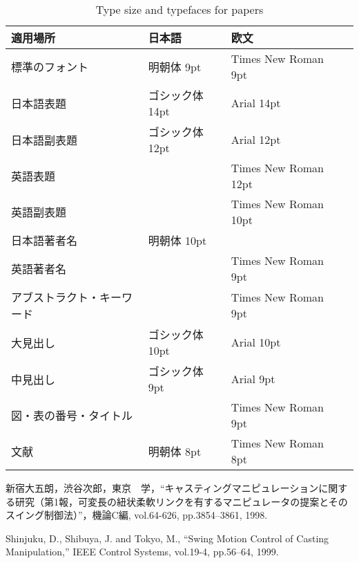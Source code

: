 \documentclass{jarticle}
\begin{document}
\begin{table}[tb]
 \caption{Type size and typefaces for papers}
 \label{tbl: table1}
 \centering
 \footnotesize
 \begin{tabular}{|p{}|l|l|l|}
  \hline
	適用場所	&日本語	&欧文 \\\hline
	標準のフォント	&明朝体 9pt	&Times New Roman 9pt \\\hline
	日本語表題	&ゴシック体 14pt	&Arial 14pt \\\hline
	日本語副表題	&ゴシック体 12pt	&Arial 12pt \\\hline
	英語表題	&&Times New Roman 12pt \\\hline
	英語副表題	&&Times New Roman 10pt \\\hline
	日本語著者名	&明朝体 10pt &\\\hline
	英語著者名	&&Times New Roman 9pt \\\hline
	アブストラクト・キーワード	&&Times New Roman 9pt \\\hline
	大見出し	&ゴシック体 10pt	&Arial 10pt \\\hline
	中見出し	&ゴシック体 9pt	&Arial 9pt \\\hline
	図・表の番号・タイトル	 &&Times New Roman 9pt \\\hline
	文献	&明朝体 8pt	&Times New Roman 8pt \\
  \hline
 \end{tabular}
\end{table}



\footnotesize
\begin{thebibliography}{99}

新宿大五朗，渋谷次郎，東京　学，``キャスティングマニピュレーションに関する研究（第1報，可変長の紐状柔軟リンクを有するマニピュレータの提案とそのスイング制御法）''，機論C編, vol.64-626, pp.3854--3861, 1998.

Shinjuku, D., Shibuya, J. and Tokyo, M., ``Swing Motion Control of Casting Manipulation,'' IEEE Control Systems, vol.19-4, pp.56--64, 1999.

\end{thebibliography}

\normalsize
\end{document}
